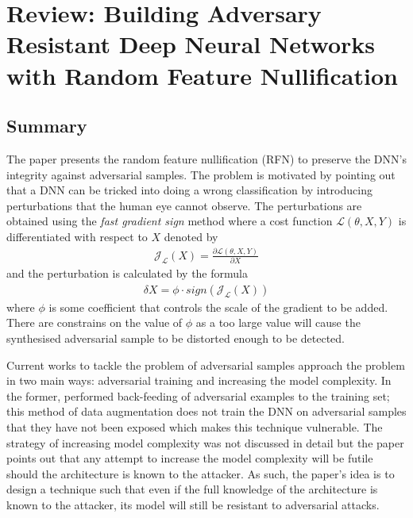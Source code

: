 \documentclass[a4paper,10pt,leqno]{article}
\theoremstyle{definition}
\begin{document}
\section*{Review: Building Adversary Resistant Deep Neural Networks with Random Feature Nullification}
\subsection*{Summary}
The paper presents the random feature nullification (RFN) to preserve the DNN's integrity against adversarial samples. The problem is motivated by pointing out that a DNN can be tricked into doing a wrong classification by introducing perturbations that the human eye cannot observe. The perturbations are obtained using the \emph{fast gradient sign} method \cite{goodfellow2014explaining} where a cost function $\mathcal{L}(\theta,X,Y)$ is differentiated with respect to $X$ denoted by
\begin{align*}
\mathcal{J}_{\mathcal{L}}(X)=\frac{\partial \mathcal{L}(\theta,X,Y)}{\partial X}
\end{align*}
and the perturbation is calculated by the formula
\begin{align*}
\delta X = \phi \cdot sign(\mathcal{J}_{\mathcal{L}}(X))
\end{align*}
where $\phi$ is some coefficient that controls the scale of the gradient to be added. There are constrains on the value of $\phi$ as a too large value will cause the synthesised adversarial sample to be distorted enough to be detected. 

Current works to tackle the problem of adversarial samples approach the problem in two main ways: adversarial training and increasing the model complexity. In the former, \cite{szegedy2013intriguing} performed back-feeding of adversarial examples to the training set; this method of data augmentation does not train the DNN on adversarial samples that they have not been exposed which makes this technique vulnerable. The strategy of increasing model complexity was not discussed in detail but the paper points out that any attempt to increase the model complexity will be futile should the architecture is known to the attacker. As such, the paper's idea is to design a technique such that even if the full knowledge of the architecture is known to the attacker, its model will still be resistant to adversarial attacks. 
\end{document}
